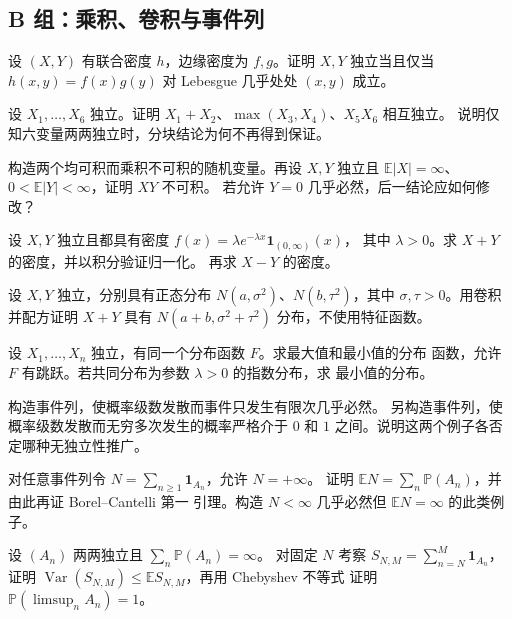 \subsection*{B 组：乘积、卷积与事件列}
\begin{enumerate}[label=\textbf{\thechapter.\arabic*.},resume]
设 $(X,Y)$ 有联合密度 $h$，边缘密度为 $f,g$。证明 $X,Y$ 独立当且仅当
$h(x,y)=f(x)g(y)$ 对 Lebesgue 几乎处处 $(x,y)$ 成立。

设 $X_1,\ldots,X_6$ 独立。证明
$X_1+X_2$、$\max(X_3,X_4)$、$X_5X_6$ 相互独立。
说明仅知六变量两两独立时，分块结论为何不再得到保证。

构造两个均可积而乘积不可积的随机变量。再设 $X,Y$ 独立且
$\mathbb E|X|=\infty$、$0<\mathbb E|Y|<\infty$，证明 $XY$ 不可积。
若允许 $Y=0$ 几乎必然，后一结论应如何修改？

设 $X,Y$ 独立且都具有密度 $f(x)=\lambda e^{-\lambda x}\mathbf 1_{(0,\infty)}(x)$，
其中 $\lambda>0$。求 $X+Y$ 的密度，并以积分验证归一化。
再求 $X-Y$ 的密度。

设 $X,Y$ 独立，分别具有正态分布 $N(a,\sigma^2)$、$N(b,\tau^2)$，其中
$\sigma,\tau>0$。用卷积并配方证明 $X+Y$ 具有
$N(a+b,\sigma^2+\tau^2)$ 分布，不使用特征函数。

设 $X_1,\ldots,X_n$ 独立，有同一个分布函数 $F$。求最大值和最小值的分布
函数，允许 $F$ 有跳跃。若共同分布为参数 $\lambda>0$ 的指数分布，求
最小值的分布。

构造事件列，使概率级数发散而事件只发生有限次几乎必然。
另构造事件列，使概率级数发散而无穷多次发生的概率严格介于 $0$ 和 $1$
之间。说明这两个例子各否定哪种无独立性推广。

对任意事件列令 $N=\sum_{n\ge1}\mathbf 1_{A_n}$，允许 $N=+\infty$。
证明 $\mathbb E N=\sum_n\mathbb P(A_n)$，并由此再证 Borel--Cantelli 第一
引理。构造 $N<\infty$ 几乎必然但 $\mathbb E N=\infty$ 的此类例子。

设 $(A_n)$ 两两独立且 $\sum_n\mathbb P(A_n)=\infty$。
对固定 $N$ 考察 $S_{N,M}=\sum_{n=N}^M\mathbf 1_{A_n}$，证明
$\operatorname{Var}(S_{N,M})\le\mathbb E S_{N,M}$，再用 Chebyshev 不等式
证明 $\mathbb P(\limsup_nA_n)=1$。
\end{enumerate}

